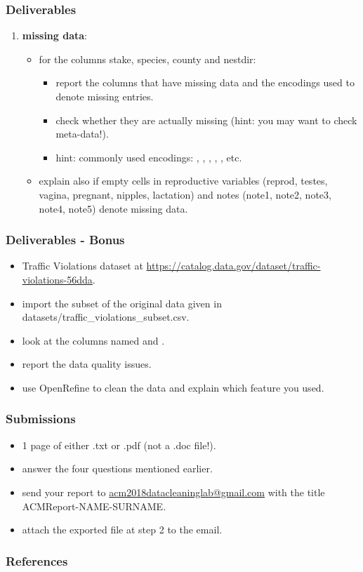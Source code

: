 \documentclass{beamer}					%
\begin{document}
 \begin{frame}[c]
 \frametitle{Deliverables}
 \begin{enumerate}
 \setcounter{enumi}{\theenumTemp}
\item \textbf{missing data}:
\begin{itemize}
\item for the columns stake, species, county and nestdir:
\begin{itemize}
\item report the columns that have missing data and the encodings used to denote missing entries.
\item check whether they are actually missing (hint: you may want to check meta-data!).
\item hint: commonly used encodings: , , , , , etc. 
\end{itemize}
\item explain also if empty cells in reproductive variables (reprod, testes, vagina, pregnant, nipples, lactation) and notes (note1, note2, note3, note4, note5) denote missing data.
\end{itemize}
 \end{enumerate}
\end{frame}

 \begin{frame}[c]
 \frametitle{Deliverables - Bonus}
 \begin{itemize}
 \item Traffic Violations dataset at \footnotesize{\url{https://catalog.data.gov/dataset/traffic-violations-56dda}}.
 \item import the subset of the original data given in datasets/traffic\_violations\_subset.csv.
 \item look at the columns named  and .
 \item report the data quality issues.
 \item use OpenRefine to clean the data and explain which feature you used.
 \end{itemize}
\end{frame}


\begin{frame}[c]
 \frametitle{Submissions}
 \begin{itemize}
\item 1 page of either .txt or .pdf (not a .doc file!).
\item answer the four questions mentioned earlier.
\item send your report to \footnotesize{\url{acm2018datacleaninglab@gmail.com}} with the title ACMReport-NAME-SURNAME.
\item attach the exported file at step 2 to the email.
 \end{itemize}
\end{frame}

\begin{frame}[t, allowframebreaks]
\frametitle{References}

\end{frame}
\end{document}
